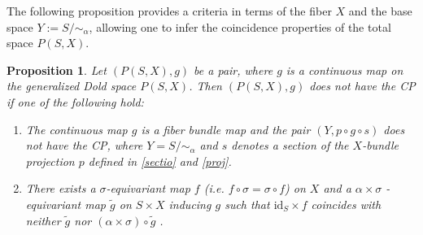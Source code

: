 \documentclass{amsart}
\newtheorem{proposition}[theorem]{Proposition}
\newcommand{\subsecref}[1]{Subsection~\ref{#1}}
\begin{document}
	
	 The following proposition provides a criteria in terms of the fiber $X$ and the base space $Y := S/\!\!\sim_\alpha$, allowing one to infer the coincidence properties of the total space $P(S,X)$.
	
	
	
	\begin{proposition}\label{necessary condition}
		Let $(P(S,X),g)$ be a pair, where $g$ is a continuous map on the generalized Dold space $P(S,X)$. Then $(P(S,X),g)$ does not have the CP if one of the following %
hold:
		\begin{enumerate}
			\item The %
continuous map $g$ is a fiber bundle map and the pair $(Y,p \circ g \circ s)$ does not have the CP, 
			where $Y = S/\!\!\sim_\alpha$ and $s$ denotes a section of the $X$-bundle projection $p$ defined in \eqref{sectio} %
and \eqref{proj}.
			
			\item  
			There %
exists a $\sigma$-equivariant map $f$ (i.e. $f\circ\sigma =\sigma\circ f$) on $X$ %
and a $\alpha \times \sigma$%
-equivariant map $\tilde g$ on $S\times X$ inducing $g$ such that
			$\mathrm{id}_S \times f$ coincides with neither $\tilde{g}$ nor
			$(\alpha \times \sigma) \circ \tilde{g}$%
.
		\end{enumerate}
		
		
		
	\end{proposition}
\end{document}
